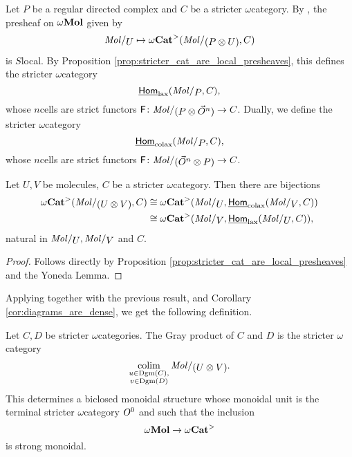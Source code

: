 \begin{dfn} 
    Let \( P \) be a regular directed complex and \( C \) be a stricter \( \omega \)\nbd category.
    By \cite[Lemma 7.2.8]{hadzihasanovic2024combinatorics}, the presheaf on \( \omega\mathbf{Mol} \) given by
    \begin{equation*}
        \molecin{U} \mapsto \somegaCat(\molecin{(P \gray U)}, C) 
    \end{equation*}
    is \( S \)\nbd local.
    By Proposition \ref{prop:stricter_cat_are_local_presheaves}, this defines the stricter \( \omega \)\nbd category 
    \begin{equation*}
        \homlax(\molecin{P}, C),
    \end{equation*}
    whose \( n \)\nbd cells are strict functors \( \F \colon \molecin{(P \gray \dglobe{n})} \to C \).
    Dually, we define the stricter \( \omega \)\nbd category
    \begin{equation*}
        \homcolax(\molecin{P}, C),
    \end{equation*}
    whose \( n \)\nbd cells are strict functors \( \F \colon \molecin{(\dglobe{n} \gray P)} \to C \).
\end{dfn}

\begin{lem}
    Let \( U, V \) be molecules, \( C \) be a stricter \( \omega \)\nbd category.
    Then there are bijections
    \begin{align*}
        \somegaCat(\molecin{(U \gray V)}, C) &\cong \somegaCat(\molecin{U}, \homcolax(\molecin{V}, C)) \\
                                             &\cong \somegaCat(\molecin{V}, \homlax(\molecin{U}, C)),
    \end{align*}
    natural in \( \molecin{U}, \molecin{V} \) and \( C \).
\end{lem}
\begin{proof}
    Follows directly by Proposition \ref{prop:stricter_cat_are_local_presheaves} and the Yoneda Lemma. 
\end{proof}

Applying \cite[Th\'eor\`eme 5.3]{ara2020joint} together with the previous result, and Corollary \ref{cor:diagrams_are_dense}, we get the following definition.
\begin{dfn} 
    Let \( C, D \) be stricter \( \omega \)\nbd categories.
    The Gray product of \( C \) and \( D \) is the stricter \( \omega \)\nbd category
    \begin{equation*}
        \colim_{\substack{u \in \Dgm(C),\\ v \in \Dgm(D)}} \molecin{(U \gray V)}.
    \end{equation*}
    This determines a biclosed monoidal structure whose monoidal unit is the terminal stricter \( \omega \)\nbd category \( O^{0} \) and such that the inclusion
    \begin{equation*}
        \omega\mathbf{Mol} \to {\omega\mathbf{Cat}}^>
    \end{equation*}
    is strong monoidal.
\end{dfn}

